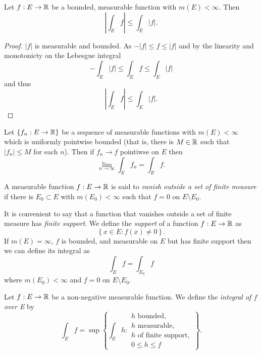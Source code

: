 \begin{corollary}[]
	Let $f: E \to \mathbb{R}$ be a bounded, measurable function with $m(E) < \infty$.
	Then
	\[
		\left\lvert \int_E f \right\rvert 
		\leq \int_E \left\lvert f \right\rvert.
	\]
\end{corollary}

\begin{proof}
	$\left\lvert f \right\rvert$ is measurable and bounded.
	As $-\left\lvert f \right\rvert \leq f \leq \left\lvert f \right\rvert$
	and by the linearity and monotonicty on the Lebesgue integral
	\[
		-\int_E \left\lvert f \right\rvert
		\leq \int_E f
		\leq \int_E \left\lvert f \right\rvert
	\]
	and thus
	\[
		\left\lvert \int_E f \right\rvert 
		\leq \int_E \left\lvert f \right\rvert.
	\]
\end{proof}

\begin{theorem}
	Let
	$
		\left\{
			f_n: E \to \mathbb{R}
		\right\}
	$
	be a sequence of measurable functions with $m(E) < \infty$
	which is uniformly pointwise bounded
	(that is, there is $M \in \mathbb{R}$ such that 
	$\left\lvert f_n \right\rvert \leq M$ for each $n$).
	Then if $f_n \to f$ pointiwse on $E$ then
	\[
		\lim_{n \to \infty} \int_E f_n = \int_E f.
	\]
\end{theorem}

\begin{definition}[Vanish]
	A measurable function $f: E \to \mathbb{R}$ is said to
	\emph{vanish outside a set of finite measure}
	if there is $E_0 \subset E$ with $m(E_0) < \infty$ such that
	$f = 0$ on $E \setminus E_0$.
\end{definition}

It is convenient to say that a function that vanishes outside a set of
finite measure has \emph{finite support}.
We define the \emph{support} of a function $f: E \to \mathbb{R}$ as
\[
	\left\{
		x \in E: f(x) \neq 0
	\right\}.
\]
If $m(E) = \infty$, $f$ is bounded, and measurable on $E$
but has finite support then we can define its integral as
\[
	\int_E f = \int_{E_0} f
\]
where $m(E_0) < \infty$ and $f = 0$ on $E \setminus E_0$.

\begin{definition}[]
	Let $f: E \to \mathbb{R}$ be a non-negative measurable function.
	We define the \emph{integral of $f$ over E}
	by
	\[
		\int_E f
		= \sup\left\{
			\int_E h:
			\begin{array}{l}
				\text{$h$ bounded}, \\
				\text{$h$ measurable}, \\
				\text{$h$ of finite support}, \\
				0 \leq h \leq f
			\end{array}
		\right\}.
	\]
\end{definition}

